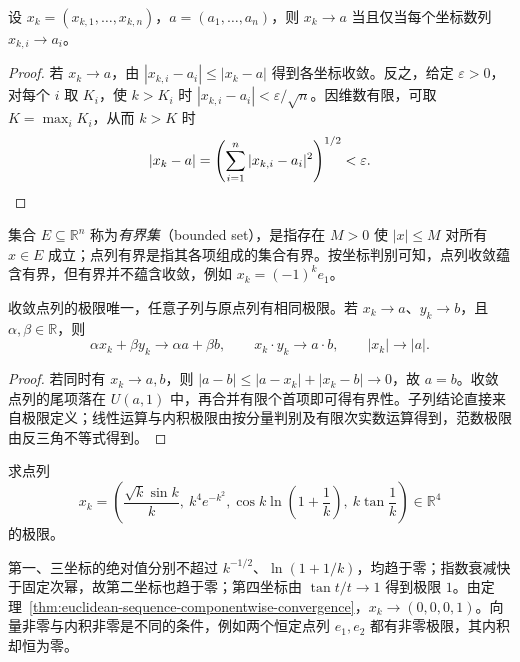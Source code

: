 \documentclass[UTF8,12pt,a4paper,fontset=fandol]{ctexbook}
\begin{document}
\begin{theorem}[按分量判定收敛]
\label{thm:euclidean-sequence-componentwise-convergence}
设 $x_k=(x_{k,1},\ldots,x_{k,n})$，$a=(a_1,\ldots,a_n)$，则 $x_k\to a$ 当且仅当每个坐标数列 $x_{k,i}\to a_i$。
\end{theorem}

\begin{proof}
若 $x_k\to a$，由 $|x_{k,i}-a_i|\leq|x_k-a|$ 得到各坐标收敛。反之，给定 $\varepsilon>0$，对每个 $i$ 取 $K_i$，使 $k>K_i$ 时 $|x_{k,i}-a_i|<\varepsilon/\sqrt n$。因维数有限，可取 $K=\max_i K_i$，从而 $k>K$ 时
\[
    |x_k-a|=\left(\sum_{i=1}^n|x_{k,i}-a_i|^2\right)^{1/2}<\varepsilon.
    \qedhere
\]
\end{proof}

集合 $E\subseteq\mathbb R^n$ 称为\emph{有界集}（bounded set），是指存在 $M>0$ 使 $|x|\leq M$ 对所有 $x\in E$ 成立；点列有界是指其各项组成的集合有界。按坐标判别可知，点列收敛蕴含有界，但有界并不蕴含收敛，例如 $x_k=(-1)^k e_1$。

\begin{proposition}
\label{prop:euclidean-sequence-limit-rules}
收敛点列的极限唯一，任意子列与原点列有相同极限。若 $x_k\to a$、$y_k\to b$，且 $\alpha,\beta\in\mathbb R$，则
\[
    \alpha x_k+\beta y_k\to\alpha a+\beta b,\qquad
    x_k\cdot y_k\to a\cdot b,\qquad |x_k|\to|a|.
\]
\end{proposition}

\begin{proof}
若同时有 $x_k\to a,b$，则 $|a-b|\leq|a-x_k|+|x_k-b|\to0$，故 $a=b$。收敛点列的尾项落在 $U(a,1)$ 中，再合并有限个首项即可得有界性。子列结论直接来自极限定义；线性运算与内积极限由按分量判别及有限次实数运算得到，范数极限由反三角不等式得到。
\end{proof}

\begin{example}
\label{ex:four-dimensional-point-sequence-limit}
求点列
\[
    x_k=\left(\frac{\sqrt k\sin k}{k},\ k^4e^{-k^2},
              \cos k\ln\left(1+\frac1k\right),\ k\tan\frac1k\right)
    \in\mathbb R^4
\]
的极限。
\end{example}

\begin{solve}
第一、三坐标的绝对值分别不超过 $k^{-1/2}$、$\ln(1+1/k)$，均趋于零；指数衰减快于固定次幂，故第二坐标也趋于零；第四坐标由 $\tan t/t\to1$ 得到极限 $1$。由定理~\ref{thm:euclidean-sequence-componentwise-convergence}，$x_k\to(0,0,0,1)$。向量非零与内积非零是不同的条件，例如两个恒定点列 $e_1,e_2$ 都有非零极限，其内积却恒为零。
\end{solve}
\end{document}
